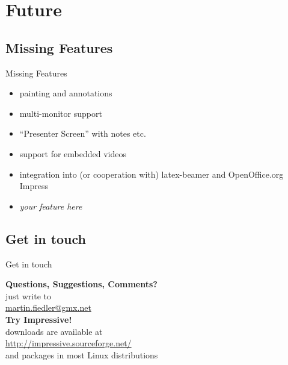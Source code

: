 \documentclass[bigger,hyperref={colorlinks=true,linkcolor=white,urlcolor=blue}]{beamer}
\begin{document}
\section{Future}
\subsection{Missing Features}
\begin{frame}{Missing Features}
    \begin{itemize}
        \item painting and annotations
        \item multi-monitor support
        \item ``Presenter Screen'' with notes etc.
        \item support for embedded videos
        \item integration into (or cooperation with) latex-beamer
              and OpenOffice.org Impress
        \item \alert{\emph{your feature here}}
    \end{itemize}
\end{frame}

\subsection{Get in touch}
\begin{frame}{Get in touch}
\begin{center}
    \textbf{Questions, Suggestions, Comments?} \\
    just write to \\
    \href{mailto:martin.fiedler@gmx.net}{martin.fiedler@gmx.net}
    \vspace{1.5cm} \\
    \textbf{Try Impressive!} \\
    downloads are available at \\
    \href{http://impressive.sourceforge.net/}{http://impressive.sourceforge.net/} \\
    and packages in most Linux distributions
\end{center}
\end{frame}
\end{document}
